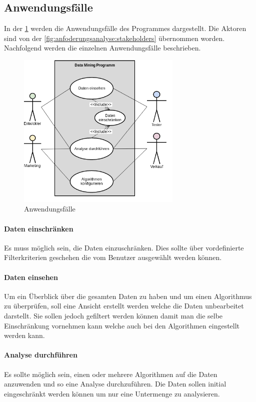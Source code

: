\subsection{Anwendungsfälle}
\label{sec:anforderungsanalyse:anwendungsfaelle}
In der \cref{fig:anfoderungsanalyse:anwendungsfaelle:1} werden die Anwendungsfälle des Programmes dargestellt. Die Aktoren sind von der \cref{fig:anfoderungsanalyse:stakeholders} übernommen worden. Nachfolgend werden die einzelnen Anwendungsfälle beschrieben.
\begin{figure}[H]
	\RawFloats
	\centering
	\includegraphics[width=0.7\textwidth]{images/usecase}
	\caption{Anwendungsfälle}
	\label{fig:anfoderungsanalyse:anwendungsfaelle:1}
\end{figure}

\paragraph{Daten einschränken} Es muss möglich sein, die Daten einzuschränken. Dies sollte über vordefinierte Filterkriterien geschehen die vom Benutzer ausgewählt werden können.

\paragraph{Daten einsehen} Um ein Überblick über die gesamten Daten zu haben und um einen Algorithmus zu überprüfen, soll eine Ansicht erstellt werden welche die Daten unbearbeitet darstellt. Sie sollen jedoch gefiltert werden können damit man die selbe Einschränkung vornehmen kann welche auch bei den Algorithmen eingestellt werden kann.

\paragraph{Analyse durchführen} Es sollte möglich sein, einen oder mehrere Algorithmen auf die Daten anzuwenden und so eine Analyse durchzuführen. Die Daten sollen initial eingeschränkt werden können um nur eine Untermenge zu analysieren.


